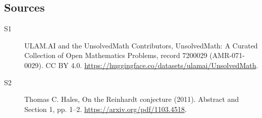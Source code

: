 \documentclass[11pt]{article}
\begin{document}
\subsection{Sources}
\begin{description}
\item[\hypertarget{source:7200029:1}{S1}] ULAM.AI and the UnsolvedMath Contributors, UnsolvedMath: A Curated Collection of Open Mathematics Problems, record 7200029 (AMR-071-0029). CC BY 4.0. \url{https://huggingface.co/datasets/ulamai/UnsolvedMath}.
\item[\hypertarget{source:7200029:2}{S2}] Thomas C. Hales, On the Reinhardt conjecture (2011). Abstract and Section 1, pp. 1–2. \url{https://arxiv.org/pdf/1103.4518}.
\end{description}
\label{end:7200029}
\end{document}

